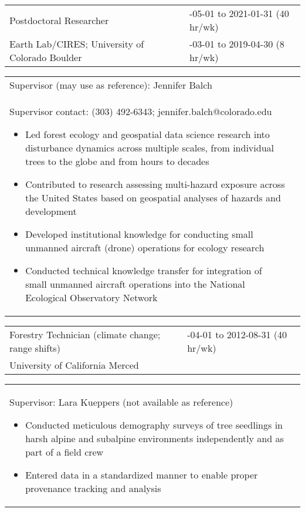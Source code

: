 \documentclass[10pt,english]{article}
\providecommand{\tabularnewline}{\\}
\begin{document}
\renewcommand{\arraystretch}{1.2}
\begin{tabularx}{\textwidth}{@{}>{\raggedright}p{3.75in} >{\raggedleft}X@{}}
Postdoctoral Researcher & 2019-05-01 to 2021-01-31 (40 hr/wk) \tabularnewline
Earth Lab/CIRES; University of Colorado Boulder & 2019-03-01 to 2019-04-30 (8 hr/wk) \tabularnewline
\end{tabularx}

\renewcommand{\arraystretch}{1.2}
\begin{tabularx}{\textwidth}{@{}>{\raggedright}p{6.25in} >{\raggedleft}X@{}}
\addtolength{\leftskip}{5ex}Supervisor (may use as reference): Jennifer Balch \tabularnewline
\addtolength{\leftskip}{5ex}Supervisor contact: (303) 492-6343; jennifer.balch@colorado.edu
\begin{itemize}
\itemsep0em
\item{Led forest ecology and geospatial data science research into disturbance dynamics across multiple scales, from individual trees to the globe and from hours to decades}
\item{Contributed to research assessing multi-hazard exposure across the United States based on geospatial analyses of hazards and development}
\item{Developed institutional knowledge for conducting small unmanned aircraft (drone) operations for ecology research}
\item{Conducted technical knowledge transfer for integration of small unmanned aircraft operations into the National Ecological Observatory Network} 
\end{itemize}
\end{tabularx}

\renewcommand{\arraystretch}{1.2}
\begin{tabularx}{\textwidth}{@{}>{\raggedright}p{3.75in} >{\raggedleft}X@{}}
Forestry Technician (climate change; range shifts) & 2012-04-01 to 2012-08-31 (40 hr/wk) \tabularnewline
University of California Merced & \tabularnewline
\end{tabularx}

\renewcommand{\arraystretch}{1.2}
\begin{tabularx}{\textwidth}{@{}>{\raggedright}p{6.25in} >{\raggedleft}X@{}}
\addtolength{\leftskip}{5ex}Supervisor: Lara Kueppers (not available as reference)
\begin{itemize}
\itemsep0em
\item{Conducted meticulous demography surveys of tree seedlings in harsh alpine and subalpine environments independently and as part of a field crew}
\item{Entered data in a standardized manner to enable proper provenance tracking and analysis}
\end{itemize}
\end{tabularx}
\end{document}
